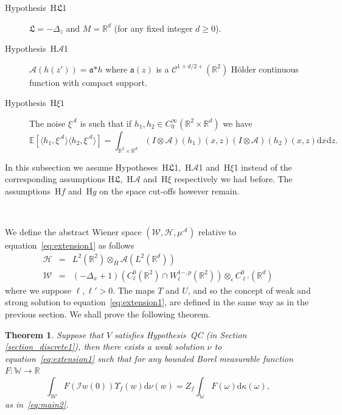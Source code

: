 \documentclass[a4paper,10pt]{article}
\newcommand{\asterisk}{\mathord{*}}
\newcommand{\mathd}{\mathrm{d}}
\newtheorem{theorem}{Theorem}
\newcommand{\descriptionparagraphs}[1]{\begin{description}#1\end{description}}
\begin{document}
{\descriptionparagraphs{
  \item[Hypothesis~H$\mathfrak{L}$1] $\mathfrak{L} = - \Delta_z$ and $M
  =\mathbb{R}^d$ (for any fixed integer $d \geqslant 0$).
  
  \item[Hypothesis~H$\mathcal{A}$1] $\mathcal{A} (h (z')) = \mathfrak{a}
  \asterisk h$ where $\mathfrak{a} (z)$ is a $\mathcal{C}^{1 + d / 2 +}
  (\mathbb{R}^2)$ H{\"o}lder continuous function with compact support.
  
  \item[Hypothesis~H$\xi 1$] The noise $\xi^{\mathcal{A}}$ is such that if
  $h_1, h_2 \in C^{\infty}_0 (\mathbb{R}^2 \times \mathbb{R}^d)$ we have
  \[ \mathbb{E} [\langle h_1, \xi^{\mathcal{A}} \rangle \langle h_2,
     \xi^{\mathcal{A}} \rangle] = \int_{\mathbb{R}^2 \times \mathbb{R}^d} (I
     \otimes \mathcal{A}) (h_1) (x, z) (I \otimes \mathcal{A}) (h_2) (x, z)
     \mathd x \mathd z. \]
  }}
  
In this subsection we assume Hypotheses~H$\mathfrak{L}$1,~H$\mathcal{A}$1
and~H$\xi$1 instead of the corresponding assumptions
H$\mathfrak{L}$,~H$\mathcal{A}$ and~H$\xi$ respectively we had before. The
assumptions~H$f$ and~H$g$ on the space cut-offs however remain.

\

We define the abstract Wiener space $(\mathcal{W}, \mathcal{H},
\mu^{\mathcal{A}})$ relative to equation~{\eqref{eq:extension1}} as follows
\begin{eqnarray}
  \mathcal{H} & = & L^2 (\mathbb{R}^2) \otimes_H \mathcal{A} (L^2
  (\mathbb{R}^d)) \nonumber\\
  \mathcal{W} & = & (- \Delta_x + 1) (C^0_{\ell} (\mathbb{R}^2) \cap W^{1 -,
  p}_{\ell} (\mathbb{R}^2)) \otimes_{\epsilon} C^0_{\ell'} (\mathbb{R}^d)
  \nonumber
\end{eqnarray}
where we suppose $\ell, \ell' > 0$. The maps $T$ and $U$, and so the concept
of weak and strong solution to equation~{\eqref{eq:extension1}}, are defined
in the same way as in the previous section. We shall prove the following
theorem.

\begin{theorem}
  \label{theorem_extension1}Suppose that $V$ satisfies Hypothesis~QC (in
  Section \ref{section_discrete1}), then there exists a weak solution $\nu$ to
  equation~{\eqref{eq:extension1}} such that for any bounded Borel measurable
  function $F : \mathbb{W} \rightarrow \mathbb{R}$
  \[ \int_{\mathcal{W}} F (\mathcal{I} w (0)) \Upsilon_f (w) \mathd
     \nu (w) = Z_f \int_{\mathbb{W}} F (\omega) \mathd \kappa (\omega), \]
  as in~{\eqref{eq:main2}}.
\end{theorem}
\end{document}
